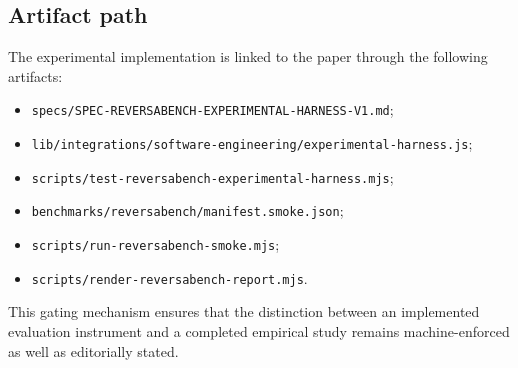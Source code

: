 
\subsection{Artifact path}

The experimental implementation is linked to the paper through the following artifacts:
\begin{itemize}
  \item \texttt{specs/SPEC-REVERSABENCH-EXPERIMENTAL-HARNESS-V1.md};
  \item \texttt{lib/integrations/software-engineering/experimental-harness.js};
  \item \texttt{scripts/test-reversabench-experimental-harness.mjs};
  \item \texttt{benchmarks/reversabench/manifest.smoke.json};
  \item \texttt{scripts/run-reversabench-smoke.mjs};
  \item \texttt{scripts/render-reversabench-report.mjs}.
\end{itemize}

This gating mechanism ensures that the distinction between an implemented evaluation instrument and a completed empirical study remains machine-enforced as well as editorially stated.
